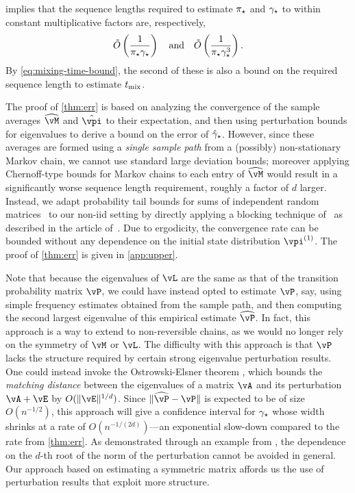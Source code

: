  implies that the sequence lengths required to estimate
$\pi_{\star}$ and
$\gamma_{\star}$ to within constant multiplicative factors are, respectively,
\[
  \tilde{O}\left(\frac1{\pi_{\star}\gamma_{\star}}\right)
  \quad\text{and}\quad
  \tilde{O}\left(\frac1{\pi_{\star}\gamma_{\star}^3}\right)
  .
\]
By \cref{eq:mixing-time-bound},
the second of these is also a bound on the required sequence length to estimate $t_{\operatorname{mix}}$.

The proof of \cref{thm:err} is based on analyzing the
convergence of the sample averages $\wh{\vM}$ and
$\hat\vpi$ to their expectation, and then using perturbation bounds
for eigenvalues to derive a bound on the error of $\hat\gamma_{\star}$.
However, since these averages are formed using a \emph{single sample
path} from a (possibly) non-stationary Markov chain, we cannot use
standard large deviation bounds; moreover applying Chernoff-type
bounds for Markov chains to each entry of $\wh{\vM}$ would result in a
significantly worse sequence length requirement, roughly a factor of
$d$ larger.
Instead, we adapt probability tail bounds for sums of independent
random matrices~\citep{tropp2015intro} to our non-iid setting by
directly applying a blocking technique of~\citet{Bernstein27} as
described in the article of~\citet{Yu94}.
Due to ergodicity, the convergence rate can be bounded without any
dependence on the initial state distribution $\vpi^{(1)}$.
The proof of \cref{thm:err} is given in \cref{app:upper}.

Note that because the eigenvalues of $\vL$ are the same as that of the
transition probability matrix $\vP$, 
we could have instead opted to
estimate $\vP$, say, using simple frequency estimates obtained from
the sample path, and then computing the second largest eigenvalue of
this empirical estimate $\wh\vP$.
In fact, this approach is a way to extend to non-reversible chains, as
we would no longer rely on the symmetry of $\vM$ or $\vL$.
The difficulty with this approach is that $\vP$ lacks the structure
required by certain strong eigenvalue perturbation results.
One could instead invoke the Ostrowski-Elsner theorem
\citep[cf.~Theorem 1.4 on Page 170 of][]{stewart1990matrix}, which
bounds the \emph{matching distance} between the eigenvalues of a
matrix $\vA$ and its perturbation $\vA+\vE$ by $O(\norm{\vE}^{1/d})$.
Since $\norm{\wh\vP-\vP}$ is expected to be of size $O(n^{-1/2})$,
this approach will give a confidence interval for $\gamma_{\star}$ whose width
shrinks at a rate of $O(n^{-1/(2d)})$---an exponential slow-down
compared to the rate from \cref{thm:err}.
As demonstrated through an example from \citet{stewart1990matrix}, the
dependence on the $d$-th root of the norm of the perturbation cannot
be avoided in general.
Our approach based on estimating a symmetric matrix affords us the use
of perturbation results that exploit more structure.

